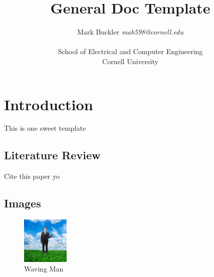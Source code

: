 \documentclass{article}
\title{General Doc Template}
\author{Mark Buckler \textit{mab598@cornell.edu} \\ \\
  School of Electrical and Computer Engineering \\
  Cornell University
}
\begin{document}
\maketitle

\section{Introduction}
\label{sec:intro}

This is one sweet template

\subsection{Literature Review}

Cite this paper yo \cite{einstein}

\subsection{Images}

\begin{figure} \centering
    \includegraphics[width=0.2\textwidth]{frame_0.png}
    \caption{Waving Man}
    \label{fig:waving_man}
\end{figure}



\end{document}
